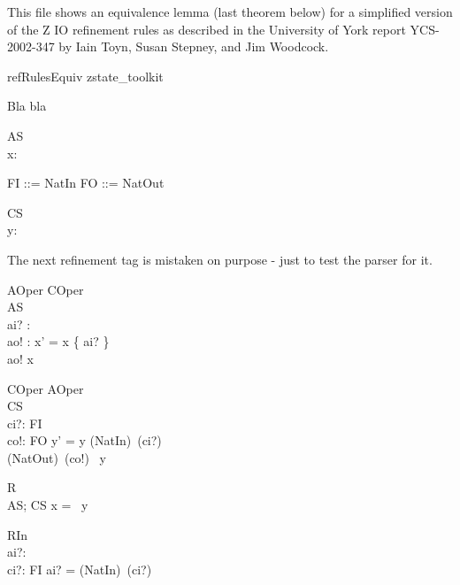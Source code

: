 This file shows an equivalence lemma (last theorem below) for a simplified
version of the Z IO refinement rules as described in the University of York
report YCS-2002-347 by Iain Toyn, Susan Stepney, and Jim Woodcock.

\begin{zsection}
   \SECTION refRulesEquiv \parents zstate\_toolkit
\end{zsection}

Bla bla

\begin{schema}{AS}
  \zastate \\
   x: \power~\nat
\end{schema}
\begin{zed}
   FI ::= NatIn \ldata \nat \rdata
 \also
   FO ::= NatOut \ldata \nat \rdata
\end{zed}

\begin{schema}{CS}
  \zcstate \\
   y: \seq~\nat
\end{schema}

The next refinement tag is mistaken on purpose - just to test the parser for it.

\begin{schema}{AOper}
  \zbsrefines COper \\
   \Delta AS\\
   ai? : \nat\\
   ao! : \nat
\where
   x' = x \cup \{ ai? \}
   \\
   ao! \in x
\end{schema}

\begin{schema}{COper}
  \zfsrefines AOper \\
   \Delta CS \\
   ci?: FI \\
   co!: FO
\where
   y' = y \cat \langle (NatIn\inv)~(ci?) \rangle \\
   (NatOut\inv)~(co!) \in \ran~y
\end{schema}

\begin{schema}{R}
  \zretrieve \\
   AS; CS
\where
   x = \ran~y
\end{schema}

\begin{schema}{RIn}
  \zretrievein \\
   ai?: \nat \\
   ci?: FI
\where
   ai? = (NatIn\inv)~(ci?)
\end{schema}

